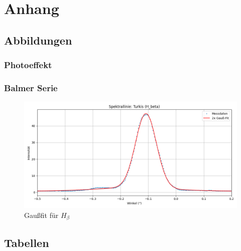\chapter{Anhang}
\section{Abbildungen}
\subsection*{Photoeffekt}
\subsection*{Balmer Serie}

\begin{figure}[H]
\centering
\includegraphics[width=0.7\linewidth]{figs/dt_turkis_145_55_5}
\caption{Gaußfit für $H_\beta$}
\label{fig:h_b}
\end{figure}


\section{Tabellen}
